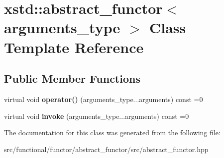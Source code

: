\hypertarget{classxstd_1_1abstract__functor}{\section{xstd\-:\-:abstract\-\_\-functor$<$ arguments\-\_\-type $>$ Class Template Reference}
\label{classxstd_1_1abstract__functor}
}
\subsection*{Public Member Functions}
\begin{DoxyCompactItemize}
\item 
\hypertarget{classxstd_1_1abstract__functor_aa396ab9aba29660208608903e1703359}{virtual void {\bfseries operator()} (arguments\-\_\-type...\-arguments) const =0}\label{classxstd_1_1abstract__functor_aa396ab9aba29660208608903e1703359}

\item 
\hypertarget{classxstd_1_1abstract__functor_ae729729f945ed0d871768fc99e76d228}{virtual void {\bfseries invoke} (arguments\-\_\-type...\-arguments) const =0}\label{classxstd_1_1abstract__functor_ae729729f945ed0d871768fc99e76d228}

\end{DoxyCompactItemize}


The documentation for this class was generated from the following file\-:\begin{DoxyCompactItemize}
\item 
src/functional/functor/abstract\-\_\-functor/src/abstract\-\_\-functor.\-hpp\end{DoxyCompactItemize}
